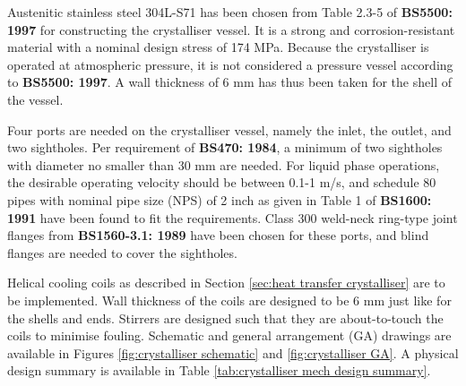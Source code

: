 Austenitic stainless steel 304L-S71 has been chosen from Table 2.3-5 of \textbf{BS5500: 1997} for constructing the crystalliser vessel. It is a strong and corrosion-resistant material with a nominal design stress of 174 MPa. Because the crystalliser is operated at atmospheric pressure, it is not considered a pressure vessel according to \textbf{BS5500: 1997}. A wall thickness of 6 mm has thus been taken for the shell of the vessel.

Four ports are needed on the crystalliser vessel, namely the inlet, the outlet, and two sightholes. Per requirement of \textbf{BS470: 1984}, a minimum of two sightholes with diameter no smaller than 30 mm are needed. For liquid phase operations, the desirable operating velocity should be between 0.1-1 m/s, and schedule 80 pipes with nominal pipe size (NPS) of 2 inch as given in Table 1 of \textbf{BS1600: 1991} have been found to fit the requirements. Class 300 weld-neck ring-type joint flanges from \textbf{BS1560-3.1: 1989} have been chosen for these ports, and blind flanges are needed to cover the sightholes. 


Helical cooling coils as described in Section \ref{sec:heat transfer crystalliser} are to be implemented. Wall thickness of the coils are designed to be 6 mm just like for the shells and ends. Stirrers are designed such that they are about-to-touch the coils to minimise fouling. Schematic and general arrangement (GA) drawings are available in Figures \ref{fig:crystalliser schematic} and \ref{fig:crystalliser GA}. A physical design summary is available in Table \ref{tab:crystalliser mech design summary}. 

